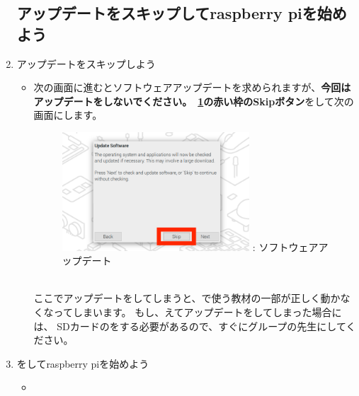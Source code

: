 \documentclass[a4paper,12pt]{jarticle}
\begin{document}
\begin{enumerate}
   \subsection{\theExercise  アップデートをスキップしてraspberry piを始めよう}   
    \item
        アップデートをスキップしよう
                \begin{itemize}
                  \item
                      次の画面に進むとソフトウェアアップデートを求められますが、\textbf{今回はアップデートをしないでください。~\ref{seq:refFigure18}の}\textbf{\color{red}赤い枠のSkipボタン}をして次の画面にします。
                      \begin{figure}[h]
                        \centering
                        \begin{minipage}{5.228cm}
                          {\upshape
                            \includegraphics[width=7.000cm]{sw_image07.png}
                            \newline
                            {\theFigure\label{seq:refFigure18}}:
                            ソフトウェアアップデート}
                        \end{minipage}
                      \end{figure}
                      \\ここでアップデートをしてしまうと、で使う教材の一部が正しく動かなくなってしまいます。
                      もし、えてアップデートをしてしまった場合には、
                      SDカードのをする必要があるので、すぐにグループの先生にしてください。
                      \bigskip
                  \end{itemize}  
    \item
        をしてraspberry piを始めよう
                \begin{itemize}
                  \item

\end{itemize}
\end{enumerate}
\end{document}
